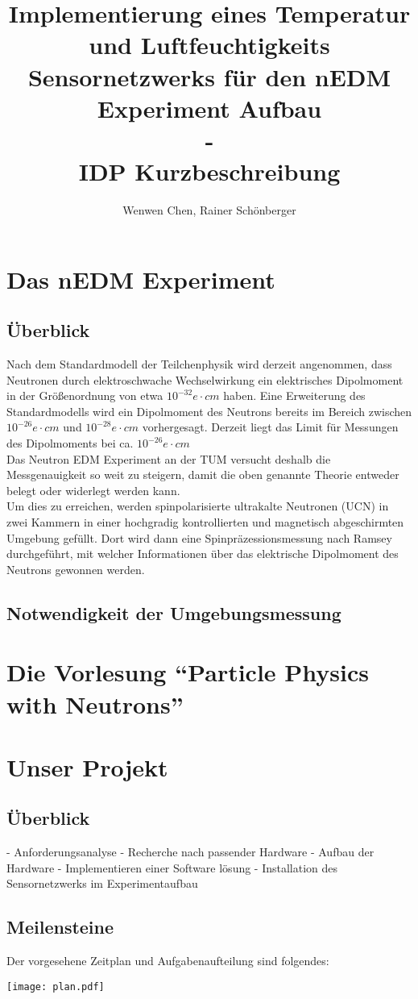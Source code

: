 \documentclass{article} %
\title{Implementierung eines Temperatur und Luftfeuchtigkeits Sensornetzwerks für den nEDM Experiment Aufbau\\-\\IDP Kurzbeschreibung}
\author{Wenwen Chen, Rainer Schönberger}
\begin{document}
\maketitle
\section*{Das nEDM Experiment}
\subsection*{Überblick}
Nach dem Standardmodell der Teilchenphysik wird derzeit angenommen, dass
Neutronen durch elektroschwache Wechselwirkung ein elektrisches Dipolmoment
in der Größenordnung von etwa $10^{-32}e\cdot cm$ haben. Eine Erweiterung des
Standardmodells wird ein Dipolmoment des Neutrons bereits im Bereich zwischen
$10^{-26}e\cdot cm$ und $10^{-28}e\cdot cm$ vorhergesagt. Derzeit liegt das
Limit für Messungen des Dipolmoments bei ca. $10^{-26}e\cdot cm$\\
Das Neutron EDM Experiment an der TUM versucht deshalb die Messgenauigkeit so
weit zu steigern, damit die oben genannte Theorie entweder belegt oder
widerlegt werden kann.\\
Um dies zu erreichen, werden spinpolarisierte ultrakalte Neutronen (UCN) in
zwei Kammern in einer hochgradig kontrollierten und magnetisch abgeschirmten
Umgebung gefüllt. Dort wird dann eine Spinpräzessionsmessung nach Ramsey
durchgeführt, mit welcher Informationen über das elektrische Dipolmoment des
Neutrons gewonnen werden.
\subsection*{Notwendigkeit der Umgebungsmessung}
\section*{Die Vorlesung ``Particle Physics with Neutrons''}
\section*{Unser Projekt}
\subsection*{Überblick}
- Anforderungsanalyse
- Recherche nach passender Hardware
- Aufbau der Hardware
- Implementieren einer Software lösung
- Installation des Sensornetzwerks im Experimentaufbau
\subsection*{Meilensteine}
Der vorgesehene Zeitplan und Aufgabenaufteilung sind folgendes:
\begin{center}
\texttt{[image: plan.pdf]}
\end{center}
\end{document}
